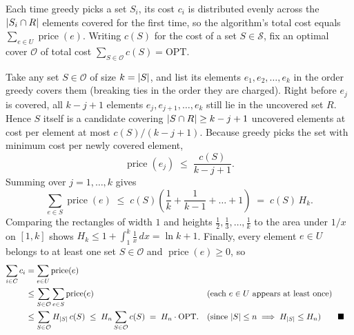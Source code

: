 \begin{whybox}
Each time greedy picks a set $S_i$, its cost $c_i$ is distributed evenly across the $\lvert S_i\cap R\rvert$
elements covered for the first time, so the algorithm's total cost equals $\sum_{e\in U}\operatorname{price}(e)$.
Writing $c(S)$ for the cost of a set $S\in\mathcal{S}$, fix an optimal cover $\mathcal{O}$ of total cost
$\sum_{S\in\mathcal{O}} c(S) = \mathrm{OPT}$.

Take any set $S\in\mathcal{O}$ of size $k=\lvert S\rvert$, and list its elements $e_1,e_2,\dots,e_k$ in the
order greedy covers them (breaking ties in the order they are charged). Right before $e_j$ is covered,
all $k-j+1$ elements $e_j,e_{j+1},\dots,e_k$ still lie in the uncovered set $R$. Hence $S$ itself is a
candidate covering $\lvert S\cap R\rvert \ge k-j+1$ uncovered elements at cost per element at most $c(S)/(k-j+1)$.
Because greedy picks the set with minimum cost per newly covered element,
\[
  \operatorname{price}(e_j) \;\le\; \frac{c(S)}{k-j+1}.
\]
Summing over $j=1,\dots,k$ gives
\[
  \sum_{e\in S}\operatorname{price}(e) \;\le\; c(S)\left(\frac{1}{k} + \frac{1}{k-1} + \dots + 1\right) \;=\; c(S)\,H_k.
\]
Comparing the rectangles of width $1$ and heights $\tfrac12,\tfrac13,\dots,\tfrac1k$ to the area under $1/x$ on $[1,k]$ shows $H_k \le 1 + \int_1^k \tfrac{1}{x}\,dx = \ln k + 1$. Finally, every element $e\in U$ belongs to at least one set $S\in\mathcal{O}$ and $\operatorname{price}(e)\ge 0$, so
\begin{align*}
  \sum_{i\in C} c_i &= \sum_{e\in U}\operatorname{price}(e) \\
  &\le \sum_{S\in\mathcal{O}}\sum_{e\in S}\operatorname{price}(e) && \text{(each $e\in U$ appears at least once)} \\
  &\le \sum_{S\in\mathcal{O}} H_{\lvert S\rvert}\, c(S) \;\le\; H_n \sum_{S\in\mathcal{O}} c(S) \;=\; H_n\cdot\mathrm{OPT}. && \text{(since $\lvert S\rvert\le n \implies H_{\lvert S\rvert}\le H_n$)} \qquad\blacksquare
\end{align*}
\end{whybox}

